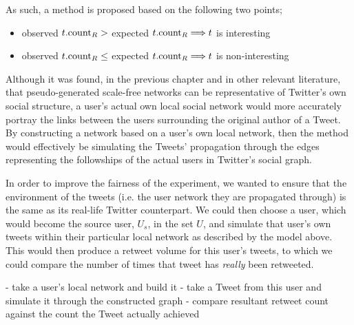 As such, a method is proposed based on the following two points;
\begin{itemize}
    \item observed $t.\textrm{count}_R >$ expected $t.\textrm{count}_R \Longrightarrow t$ is interesting
    \item observed $t.\textrm{count}_R \leq$ expected $t.\textrm{count}_R \Longrightarrow t$ is non-interesting
\end{itemize}

Although it was found, in the previous chapter and in other relevant literature, that pseudo-generated scale-free networks can be representative of Twitter's own social structure, a user's actual own local social network would more accurately portray the links between the users surrounding the original author of a Tweet. By constructing a network based on a user's own local network, then the method would effectively be simulating the Tweets' propagation through the edges representing the followships of the actual users in Twitter's social graph.

 

In order to improve the fairness of the experiment, we wanted to ensure that the environment of the tweets (i.e. the user network they are propagated through) is the same as its real-life Twitter counterpart. We could then choose a user, which would become the source user, $U_s$, in the set $U$, and simulate that user's own tweets within their particular local network as described by the model above. This would then produce a retweet volume for this user's tweets, to which we could compare the number of times that tweet has \emph{really} been retweeted.

- take a user's local network and build it
- take a Tweet from this user and simulate it through the constructed graph
- compare resultant retweet count against the count the Tweet actually achieved


